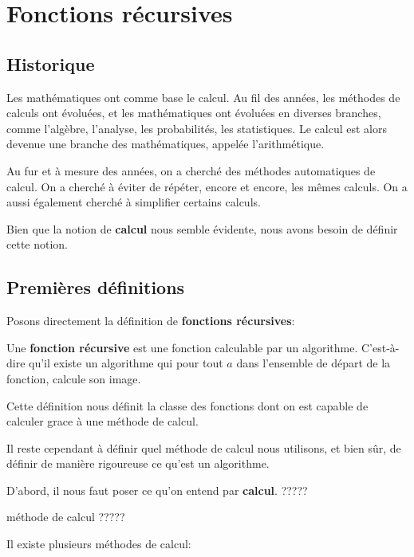 \chapter{Fonctions récursives}


\section{Historique}

Les mathématiques ont comme base le calcul. %
Au fil des années, les méthodes de calculs ont évoluées, et les mathématiques ont
évoluées en diverses branches, comme l'algèbre, l'analyse, les probabilités, les
statistiques. Le calcul est alors devenue une branche des mathématiques, appelée
l'arithmétique.

Au fur et à mesure des années, on a cherché des méthodes automatiques de calcul.
On a cherché à éviter de répéter, encore et encore, les mêmes calculs. On a
aussi également cherché à simplifier certains calculs. %

Bien que la notion de \textbf{calcul} nous semble évidente, nous avons besoin de
définir cette notion.


\section{Premières définitions}

Posons directement la définition de \textbf{fonctions récursives}:

\begin{definition}
	Une \textbf{fonction récursive} est une fonction calculable par un
	algorithme. C'est-à-dire qu'il existe un algorithme qui pour tout $a$ dans
	l'ensemble de départ de la fonction, calcule son image.
\end{definition}

Cette définition nous définit la classe des fonctions dont on est capable de
calculer grace à une méthode de calcul.

Il reste cependant à définir quel méthode de calcul nous utilisons, et bien sûr,
de définir de manière rigoureuse ce qu'est un algorithme.

D'abord, il nous faut poser ce qu'on entend par \textbf{calcul}. ?????

méthode de calcul ?????

Il existe plusieurs méthodes de calcul:

